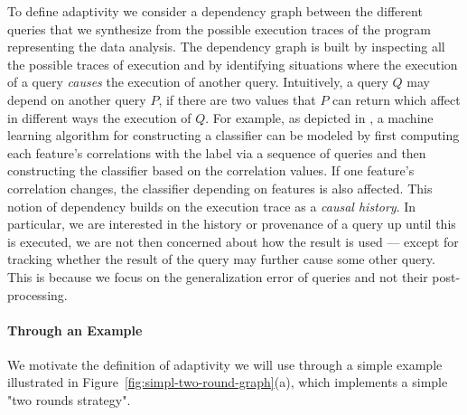 To define adaptivity we consider a dependency graph between the different queries that we synthesize from the possible execution traces of the program representing the data analysis. The dependency graph is built by inspecting all the possible traces of execution and by identifying situations where the execution of a query \emph{causes} the execution of another query. Intuitively, a query $Q$ may depend on another query $P$, if there are two values that $P$ can return which affect in different ways the execution of $Q$. 
For example, as depicted in \cite{dwork2015reusable}, a machine learning algorithm for constructing a classifier can be modeled by first computing each feature's correlations with the label via a sequence of queries and then constructing the classifier based on the correlation values. If one feature's correlation changes, the classifier depending on features is also affected.  
This notion of dependency builds on the execution trace as a \emph{causal history}. In particular, we are interested in the history or provenance of a query up until this is executed, we are not then concerned about how the result is used --- except for tracking whether the result of the query may further cause some other query. This is because we focus on the generalization error of queries and not their post-processing.  

\paragraph{Through an Example}
 We motivate the definition of adaptivity we will use through a simple example illustrated in Figure~\ref{fig:simpl-two-round-graph}(a), which implements a simple "two rounds strategy".

